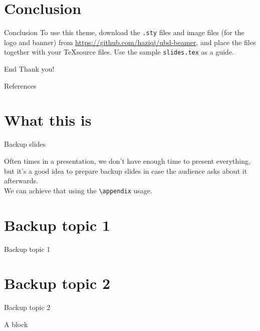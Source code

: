 \documentclass[]{beamer}
\begin{document}
\section{Conclusion}

\begin{frame}{Conclusion}
	To use this theme, download the \texttt{.sty} files and image files (for the logo and banner) from \url{https://github.com/haziqj/ubd-beamer}, and place the files together with your \TeX source files. Use the sample \texttt{slides.tex} as a guide.
\end{frame}

\begin{frame}{End}
	\centering
	\Huge Thank you!
\end{frame}

\begin{frame}{References}
	\printbibliography[heading=none]
\end{frame}

\appendix
\backupbegin

\section{What this is}

\begin{frame}{Backup slides}

	Often times in a presentation, we don't have enough time to present everything, but it's a good idea to prepare backup slides in case the audience asks about it afterwards.\\[1em]
	
	We can achieve that using the \texttt{\textbackslash appendix} usage.
	
\end{frame}

\section{Backup topic 1}

\begin{frame}{Backup topic 1}

	\lipsum[1]
	
\end{frame}

\section{Backup topic 2}

\begin{frame}{Backup topic 2}

	\begin{block}{A block}
		\lipsum[4]
	\end{block}

\end{frame}

\backupend
\end{document}
